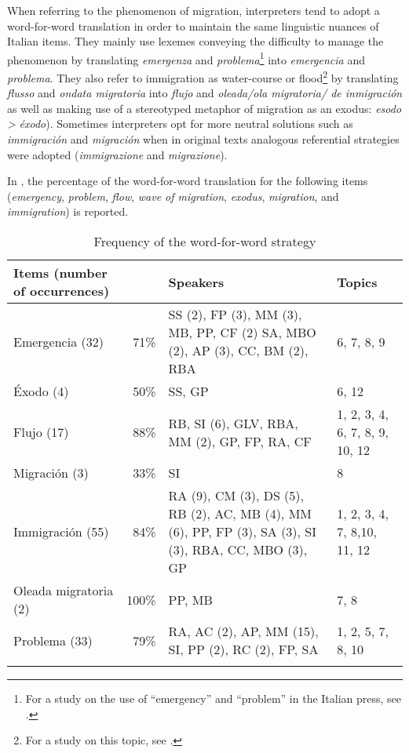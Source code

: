 \documentclass[output=paper]{langscibook}
\begin{document}
When referring to the phenomenon of migration, interpreters tend to adopt a word-for-word translation in order to maintain the same linguistic nuances of Italian items. They mainly use lexemes conveying the difficulty to manage the phenomenon by translating \textit{emergenza} and \textit{problema}\footnote{For a study on the use of “emergency” and “problem” in the Italian press, see \citet{Orru2017}.} into \textit{emergencia} and \textit{problema}. They also refer to immigration as water-course or flood\footnote{For a study on this topic, see \citet{ReisiglWodak2001}.} by translating \textit{flusso} and \textit{ondata migratoria} into \textit{flujo} and \textit{oleada/ola migratoria/ de inmigración} as well as making use of a stereotyped metaphor of migration as an exodus: \textit{esodo >} \textit{éxodo}). Sometimes interpreters opt for more neutral solutions such as \textit{immigración} and \textit{migración} when in original texts analogous referential strategies were adopted (\textit{immigrazione} and \textit{migrazione}).

In , the percentage of the word-for-word translation for the following items (\textit{emergency}, \textit{problem}, \textit{flow}, \textit{wave of migration}, \textit{exodus}, \textit{migration}, and \textit{immigration}) is reported.

\begin{table}
\begin{tabularx}{\textwidth}{QrXp{1.8cm}}

\lsptoprule

{\bfseries Items (number of occurrences)} & {\bfseries {}} & {\bfseries Speakers} & {\bfseries Topics}\\
\midrule
Emergencia (32) & 71\% & SS (2), FP (3), MM (3), MB, PP, CF (2) SA, MBO (2), AP (3), CC, BM (2), RBA & 6, 7, 8, 9\\
Éxodo (4) & 50\% & SS, GP & 6, 12\\
Flujo (17) & 88\% & RB, SI (6), GLV, RBA, MM (2), GP, FP, RA, CF & 1, 2, 3, 4, 6, 7, 8, 9, 10, 12\\
Migración (3) & 33\% & SI & 8\\
Immigración (55) & 84\% & RA (9), CM (3), DS (5), RB (2), AC, MB (4), MM (6), PP, FP (3), SA (3), SI (3), RBA, CC, MBO (3), GP & 1, 2, 3, 4, 7, 8,10, 11, 12\\
Oleada migratoria (2) & 100\% & PP, MB & 7, 8\\
Problema (33) & 79\% & RA, AC (2), AP, MM (15), SI, PP (2), RC (2), FP, SA & 1, 2, 5, 7, 8, 10\\
\lspbottomrule
\end{tabularx}

\caption{Frequency of the word-for-word strategy}
\label{tab:mori:2}
\end{table}
\end{document}
